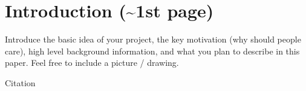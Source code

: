 \section{Introduction (\textasciitilde 1st page)}
\label{sec:intro}

Introduce the basic idea of your project, the key motivation (why should people
care), high level background information, and what you plan to describe in
this paper. Feel free to include a picture / drawing.

Citation\cite{salas:calculus}
